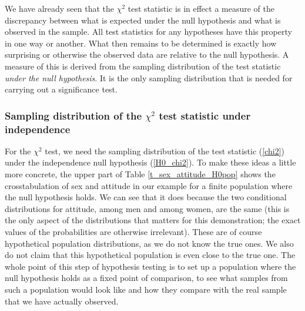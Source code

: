 We have already seen that the $\chi^{2}$ test statistic is in effect
a measure of the discrepancy between what is expected under the null
hypothesis and what is observed in the sample. All test statistics for
any hypotheses have this property in one way or another. What then
remains to be determined is exactly how surprising or otherwise the observed data
are relative to the null hypothesis. A measure of this is derived from the
sampling distribution of the test statistic \emph{under the null
hypothesis}. It is the only sampling distribution that is needed for
carrying out a significance test.

\subsubsection{Sampling distribution of the $\chi^{2}$ test statistic under independence}

For the $\chi^{2}$ test, we need the sampling distribution of the test
statistic (\ref{chi2}) under the independence null hypothesis
(\ref{H0_chi2}). To make these ideas a little more concrete, the upper
part of Table \ref{t_sex_attitude_H0pop} shows the crosstabulation of
sex and attitude in our example for a finite population where the null
hypothesis holds. We can see that it does because the two
conditional distributions for attitude, among men and among women, are
the same (this is the only aspect of the distributions that matters for this
demonstration; the exact values of the probabilities are otherwise
irrelevant). These are of course hypothetical population distributions,
as we do not know the true ones. We also do not claim that this
hypothetical population is even close to the true one. The whole point
of this step of hypothesis testing is to set up a population where the
null hypothesis holds as a fixed point of comparison, to see what
samples from such a population would look like and how they compare with
the real sample that we have actually observed.

